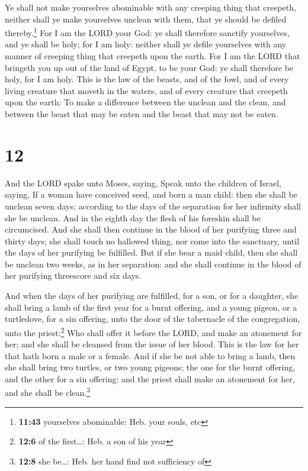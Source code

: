  Ye shall not make yourselves abominable with any
creeping thing that creepeth, neither shall ye make yourselves unclean
with them, that ye should be defiled thereby.\footnote{\textbf{11:43}
  yourselves abominable: Heb. your souls, etc}  For I am
the LORD your God: ye shall therefore sanctify yourselves, and ye shall
be holy; for I am holy: neither shall ye defile yourselves with any
manner of creeping thing that creepeth upon the earth. 
For I am the LORD that bringeth you up out of the land of Egypt, to be
your God: ye shall therefore be holy, for I am holy. 
This is the law of the beasts, and of the fowl, and of every living
creature that moveth in the waters, and of every creature that creepeth
upon the earth:  To make a difference between the unclean
and the clean, and between the beast that may be eaten and the beast
that may not be eaten.

\hypertarget{section-11}{%
\section{12}\label{section-11}}

 And the LORD spake unto Moses, saying, 
Speak unto the children of Israel, saying, If a woman have conceived
seed, and born a man child: then she shall be unclean seven days;
according to the days of the separation for her infirmity shall she be
unclean.  And in the eighth day the flesh of his foreskin
shall be circumcised.  And she shall then continue in the
blood of her purifying three and thirty days; she shall touch no
hallowed thing, nor come into the sanctuary, until the days of her
purifying be fulfilled.  But if she bear a maid child,
then she shall be unclean two weeks, as in her separation: and she shall
continue in the blood of her purifying threescore and six days.

 And when the days of her purifying are fulfilled, for a
son, or for a daughter, she shall bring a lamb of the first year for a
burnt offering, and a young pigeon, or a turtledove, for a sin offering,
unto the door of the tabernacle of the congregation, unto the
priest:\footnote{\textbf{12:6} of the first\ldots: Heb. a son of his
  year}  Who shall offer it before the LORD, and make an
atonement for her; and she shall be cleansed from the issue of her
blood. This is the law for her that hath born a male or a female.
 And if she be not able to bring a lamb, then she shall
bring two turtles, or two young pigeons; the one for the burnt offering,
and the other for a sin offering: and the priest shall make an atonement
for her, and she shall be clean.\footnote{\textbf{12:8} she be\ldots:
  Heb. her hand find not sufficiency of}

